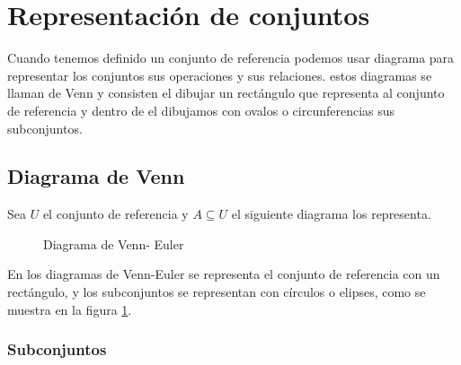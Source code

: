 \section{Representación de conjuntos}

Cuando tenemos definido un conjunto de referencia podemos usar diagrama
para representar los conjuntos sus operaciones y sus relaciones. estos
diagramas se llaman de Venn y consisten el dibujar un rectángulo que
representa al conjunto de referencia y dentro de el dibujamos con
ovalos o circunferencias sus subconjuntos.

\subsection{Diagrama de Venn}

Sea $U$ el conjunto de referencia y $A\subseteq U$ el siguiente
diagrama los representa.

\begin{figure}[H]
\centering
{} 
\caption{Diagrama de Venn- Euler} 
\label{venn}
\end{figure}  

En los diagramas de Venn-Euler se representa el conjunto de referencia
con un rectángulo, y los subconjuntos se representan con círculos
o elipses, como se muestra en la figura \ref{venn}. 

\subsubsection{Subconjuntos}

